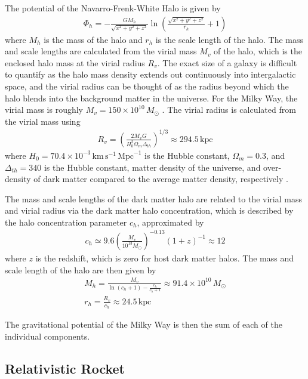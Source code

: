 \documentclass[review]{elsarticle}
\begin{document}
The potential of the Navarro-Frenk-White Halo \citep{Navarro1997} is given by
\begin{gather}
\Phi_h=-\frac{GM_h}{\sqrt{x^2+y^2+z^2}}\ln\left(\frac{\sqrt{x^2+y^2+z^2}}{r_h}+1\right)
\label{halopot}
\end{gather}
where $M_h$ is the mass of the halo and $r_h$ is the scale length of the halo. The mass and scale lengths are calculated from the virial mass $M_v$ of the halo, which is the enclosed halo mass at the virial radius $R_v$. The exact size of a galaxy is difficult to quantify as the halo mass density extends out continuously into intergalactic space, and the virial radius can be thought of as the radius beyond which the halo blends into the background matter in the universe. For the Milky Way, the virial mass is roughly $M_v=150\times10^{10}\,M_\odot$ \citep{Dehnen2006}. The virial radius is calculated from the virial mass using \citep{Kafle2014}
\begin{gather}
R_v=\left(\frac{2M_vG}{H_0^2\Omega_m\Delta_{th}}\right)^{1/3}\approx294.5\,\mathrm{kpc}
\end{gather}
where $H_0=70.4\times10^{-3}\,\mathrm{km}\,\mathrm{s}^{-1}\,\mathrm{Mpc}^{-1}$ is the Hubble constant, $\Omega_m=0.3$, and $\Delta_{th}=340$ is the Hubble constant, matter density of the universe, and over-density of dark matter compared to the average matter density, respectively \citep{Bennett2013}.

The mass and scale lengths of the dark matter halo are related to the virial mass and virial radius via the dark matter halo concentration, which is described by the halo concentration parameter $c_h$, approximated by \citep{Bullock2005}
\begin{gather}
c_h\simeq9.6\left(\frac{M_v}{10^{13}M_\odot}\right)^{-0.13}(1+z)^{-1}\approx12
\end{gather}
where $z$ is the redshift, which is zero for host dark matter halos. The mass \citep{Naray2009} and scale length \citep{Kafle2012} of the halo are then given by 
\begin{gather}
M_h=\frac{M_v}{\ln(c_h+1)-\frac{c_h}{c_h+1}}\approx91.4\times10^{10}\,M_\odot\\
r_h=\frac{R_v}{c_h}\approx24.5\,\mathrm{kpc}
\end{gather}

The gravitational potential of the Milky Way is then the sum of each of the individual components.

\subsection{Relativistic Rocket}
\end{document}
